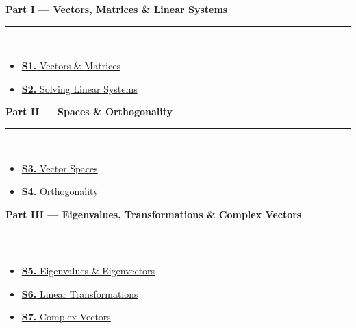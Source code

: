 \documentclass[12pt,a3paper]{article}
\begin{document}
\begin{tcolorbox}[colback=cA!5,colframe=cA,boxrule=1pt,arc=5pt,
  left=8pt,right=8pt,top=8pt,bottom=8pt,before skip=4pt]
  {\large\bfseries\textcolor{cA}{Part I --- Vectors, Matrices \& Linear Systems}}\\[5pt]
  \textcolor{cA!40}{\rule{\textwidth}{0.4pt}}\\[3pt]
  \small\begin{itemize}[leftmargin=1.2em,itemsep=1pt,label={\textcolor{cA}{$\triangleright$}}]
    \item \hyperref[sec:S1]{\textbf{S1.} Vectors \& Matrices}
    \item \hyperref[sec:S2]{\textbf{S2.} Solving Linear Systems}
  \end{itemize}
\end{tcolorbox}

\begin{tcolorbox}[colback=cB!5,colframe=cB,boxrule=1pt,arc=5pt,
  left=8pt,right=8pt,top=8pt,bottom=8pt,before skip=4pt]
  {\large\bfseries\textcolor{cB}{Part II --- Spaces \& Orthogonality}}\\[5pt]
  \textcolor{cB!40}{\rule{\textwidth}{0.4pt}}\\[3pt]
  \small\begin{itemize}[leftmargin=1.2em,itemsep=1pt,label={\textcolor{cB}{$\triangleright$}}]
    \item \hyperref[sec:S3]{\textbf{S3.} Vector Spaces}
    \item \hyperref[sec:S4]{\textbf{S4.} Orthogonality}
  \end{itemize}
\end{tcolorbox}

\begin{tcolorbox}[colback=cC!5,colframe=cC,boxrule=1pt,arc=5pt,
  left=8pt,right=8pt,top=8pt,bottom=8pt,before skip=4pt]
  {\large\bfseries\textcolor{cC}{Part III --- Eigenvalues, Transformations \& Complex Vectors}}\\[5pt]
  \textcolor{cC!40}{\rule{\textwidth}{0.4pt}}\\[3pt]
  \small\begin{itemize}[leftmargin=1.2em,itemsep=1pt,label={\textcolor{cC}{$\triangleright$}}]
    \item \hyperref[sec:S5]{\textbf{S5.} Eigenvalues \& Eigenvectors}
    \item \hyperref[sec:S6]{\textbf{S6.} Linear Transformations}
    \item \hyperref[sec:S7]{\textbf{S7.} Complex Vectors}
  \end{itemize}
\end{tcolorbox}
\end{document}
